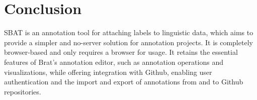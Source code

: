 \documentclass[12ptm a4paper]{article}
\begin{document}
\section{Conclusion}
SBAT is an annotation tool for attaching labels to linguistic data, which aims to provide a simpler and no-server solution for annotation projects. It is completely browser-based and only requires a browser for usage. It retains the essential features of Brat's annotation editor, such as annotation operations and visualizations, while offering integration with Github, enabling user authentication and the import and export of annotations from and to Github repositories.\\ 












\end{document}
